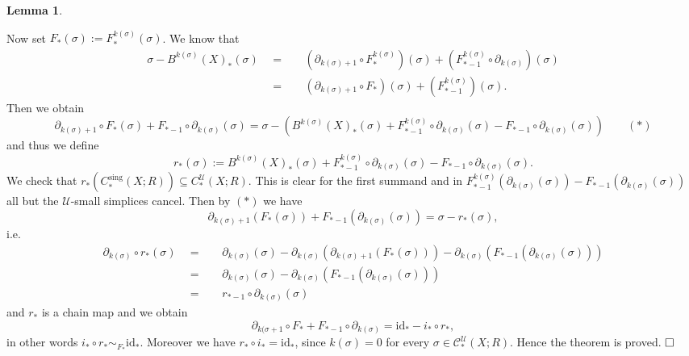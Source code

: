 \documentclass[11pt]{book}
\numberwithin{dummy}{section}
\newtheorem{lemma}[theorem]{Lemma}
\theoremstyle{nonumberbreak}
\newenvironment{pr}[1][]{\ifthenelse{\equal{#1}{}}{\proof}{\proof[#1]}\rm}{\endproof}
\newenvironment{ex}[1][]{\ifthenelse{\equal{#1}{}}{\example}{\example[#1]}\rm}{\endexample}
\newcommand{\C}{\mathcal{C}}
\newcommand{\id}{\mathrm{id}}
\newcommand{\Cs}{C^{\hspace{1pt}\mathrm{sing}}}
\begin{document}
\begin{spacing}{1.4}
\begin{ex}
\begin{lemma}
\begin{pr}
\end{pr}

\end{lemma}


Now set $F_*(\sigma) := F^{k(\sigma)}_*(\sigma)$. We know that
\begin{alignat*}
\sigma - B^{k(\sigma)}(X)_*(\sigma) \ \ &=&& \ \ \left(\partial_{k(\sigma)+1} \circ F_*^{k(\sigma)}\right)(\sigma) + \left(F_{*-1}^{k(\sigma)} \circ \partial_{k(\sigma)}\right)(\sigma) \\
&=&& \ \ \left( \partial_{k(\sigma)+1} \circ F_*\right)(\sigma) + \left( F_{*-1}^{k(\sigma)}\right)(\sigma).
\end{alignat*}
Then we obtain
$$\partial_{k(\sigma)+1} \circ F_* (\sigma) + F_{*-1} \circ \partial_{k(\sigma)}(\sigma) = \sigma - \left( B^{k(\sigma)}(X)_*(\sigma) + F_{*-1}^{k(\sigma)} \circ \partial_{k(\sigma)}(\sigma) - F_{*-1} \circ \partial_{k(\sigma)}(\sigma) \right) \qquad (*) $$ and thus we define
$$r_*(\sigma) := B^{k(\sigma)}(X)_*(\sigma) + F_{*-1}^{k(\sigma)} \circ \partial_{k(\sigma)}(\sigma) - F_{*-1} \circ \partial_{k(\sigma)}(\sigma). $$
We check that $r_*\left( \Cs_*(X;R)\right) \subseteq C_*^{\mathcal{U}}(X;R)$. This is clear for the first summand and in $F_{*-1}^{k(\sigma)} \left( \partial_{k(\sigma)}(\sigma)\right) - F_{*-1}\left( \partial_{k(\sigma)}(\sigma)\right)$ all but the $\mathcal{U}$-small simplices cancel. Then by $(*)$ we have 
$$\partial_{k(\sigma)+1} \left( F_*(\sigma)\right) + F_{*-1}\left( \partial_{k(\sigma)}(\sigma)\right) = \sigma - r_*(\sigma),$$
i.e. 
\begin{alignat*}{5}
\partial_{k(\sigma)} \circ r_*(\sigma) \ \ &=&& \ \ \partial_{k(\sigma)}(\sigma) - \partial_{k(\sigma)}\left( \partial_{k(\sigma)+1} \left( F_*(\sigma)\right)\right) - \partial_{k(\sigma)}\left( F_{*-1}\left( \partial_{k(\sigma)}(\sigma)\right)\right) \\
&=&& \ \ \partial_{k(\sigma)}(\sigma) - \partial_{k(\sigma)}\left( F_{*-1}\left( \partial_{k(\sigma)}(\sigma)\right)\right) \\
&=&& \ \ r_{*-1} \circ \partial_{k(\sigma)} (\sigma)
\end{alignat*}
and $r_*$ is a chain map and we obtain 
$$\partial_{k(\sigma+1} \circ F_* + F_{*-1} \circ \partial_{k(\sigma)} = \id_* - i_* \circ r_*,$$
in other words $i_* \circ r_* \sim_{F_*} \id_*$. Moreover we have $r_* \circ i_* = \id_*$, since $k(\sigma) = 0$ for every $\sigma \in \C_*^{\mathcal{U}}(X;R)$. Hence the theorem is proved. $\hfill \Box$

\end{ex}












\end{spacing}
\end{document}
